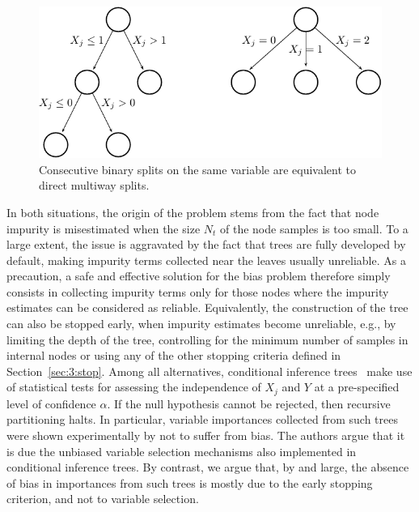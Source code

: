 \begin{figure}
    \centering
    \includegraphics[scale=1.0]{figures/ch7_splits.pdf}
    \caption{Consecutive binary splits on the same variable are equivalent to direct multiway splits.}
    \label{fig:7:splits}
\end{figure}

In both situations, the origin of the problem stems from the fact that node
impurity is misestimated when the size $N_t$ of the node samples is too small.
To a large extent, the issue is aggravated by the fact that trees are fully
developed by default, making impurity terms collected near the leaves usually
unreliable. As a precaution, a safe and effective solution for the bias problem
therefore simply consists in collecting impurity terms only for those nodes
where the impurity estimates can be considered as reliable. Equivalently, the
construction of the tree can also be stopped early, when impurity estimates
become unreliable, e.g., by limiting the depth of the tree, controlling for the
minimum number of samples in internal nodes or using any of the other  stopping
criteria defined in Section~\ref{sec:3:stop}. Among all alternatives,
conditional inference trees~\citep{hothorn:2006} make use of statistical tests
for assessing the independence of $X_j$ and $Y$ at a pre-specified level of
confidence $\alpha$. If the null hypothesis cannot be rejected, then recursive
partitioning halts. In particular, variable importances collected from such
trees were shown experimentally by \citet{strobl:2007b} not to suffer from
bias. The authors argue that it is due the unbiased variable selection
mechanisms also implemented in conditional inference trees. By contrast, we
argue that, by and large, the absence of bias in importances from such trees is
mostly due to the early stopping criterion, and not to variable selection.

